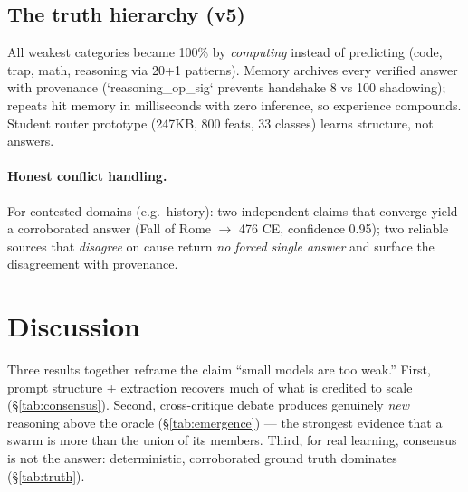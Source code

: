 \documentclass[10pt,twocolumn]{article}
\begin{document}
\subsection{The truth hierarchy (v5)}
\begin{table}[t]
  \centering
  \caption{Deterministic tiers; all run with zero model loads.}
  \label{tab:truth}
\end{table}

All weakest categories became 100\% by \emph{computing} instead of predicting (code, trap, math, reasoning via 20+1 patterns). Memory archives every verified answer with provenance (`reasoning\_op\_sig` prevents handshake 8 vs 100 shadowing); repeats hit memory in milliseconds with zero inference, so experience compounds. Student router prototype (247KB, 800 feats, 33 classes) learns structure, not answers.

\paragraph{Honest conflict handling.} For contested domains (e.g.\ history):
two independent claims that converge yield a corroborated answer (Fall of Rome
$\rightarrow$ 476 CE, confidence 0.95); two reliable sources that \emph{disagree}
on cause return \emph{no forced single answer} and surface the disagreement
with provenance.

\section{Discussion}
Three results together reframe the claim ``small models are too weak.''
First, prompt structure + extraction recovers much of what is credited to
scale (\S\ref{tab:consensus}). Second, cross-critique debate produces genuinely
\emph{new} reasoning above the oracle (\S\ref{tab:emergence}) --- the strongest
evidence that a swarm is more than the union of its members. Third, for real
learning, consensus is not the answer: deterministic, corroborated ground truth
dominates (\S\ref{tab:truth}).
\end{document}
